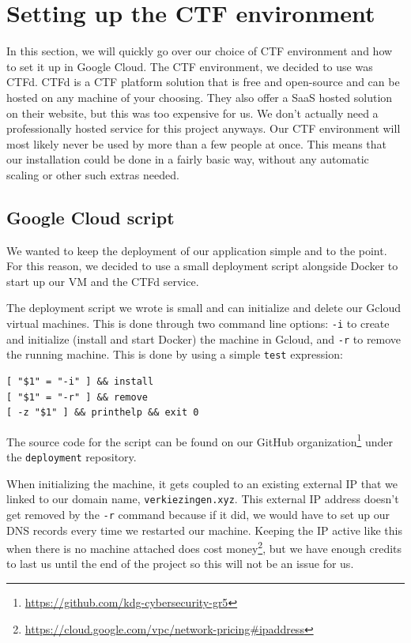 \documentclass[../main.tex]{subfiles}
\begin{document}
\section{Setting up the CTF environment}

In this section, we will quickly go over our choice of CTF environment and how to set it up in Google Cloud. The CTF environment, we decided to use was CTFd. CTFd is a CTF platform solution that is free and open-source and can be hosted on any machine of your choosing. They also offer a SaaS hosted solution on their website, but this was too expensive for us. We don't actually need a professionally hosted service for this project anyways. Our CTF environment will most likely never be used by more than a few people at once. This means that our installation could be done in a fairly basic way, without any automatic scaling or other such extras needed.

\subsection{Google Cloud script}

We wanted to keep the deployment of our application simple and to the point. For this reason, we decided to use a small deployment script alongside Docker to start up our VM and the CTFd service.

The deployment script we wrote is small and can initialize and delete our Gcloud virtual machines. This is done through two command line options: \lstinline{-i} to create and initialize (install and start Docker) the machine in Gcloud, and \lstinline{-r} to remove the running machine. This is done by using a simple \lstinline{test} expression:

\begin{lstlisting}
[ "$1" = "-i" ] && install
[ "$1" = "-r" ] && remove
[ -z "$1" ] && printhelp && exit 0
\end{lstlisting}

The source code for the script can be found on our GitHub organization\footnote{\url{https://github.com/kdg-cybersecurity-gr5}} under the \lstinline{deployment} repository.

When initializing the machine, it gets coupled to an existing external IP that we linked to our domain name, \lstinline{verkiezingen.xyz}. This external IP address doesn't get removed by the \lstinline{-r} command because if it did, we would have to set up our DNS records every time we restarted our machine. Keeping the IP active like this when there is no machine attached does cost money\footnote{\url{https://cloud.google.com/vpc/network-pricing\#ipaddress}}, but we have enough credits to last us until the end of the project so this will not be an issue for us.
\end{document}
